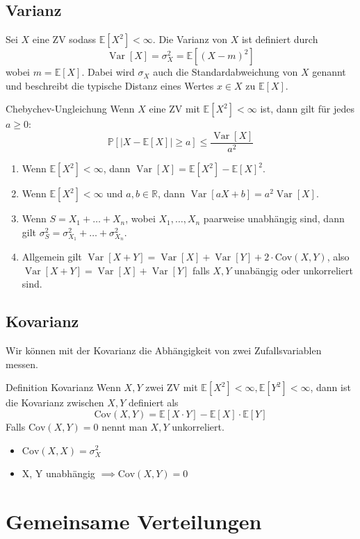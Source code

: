 \documentclass[a4paper,10pt]{article}
\def\R{\mathbb{R}}
\def\P{\mathbb{P}}
\def\E{\mathbb{E}}
\DeclareMathOperator{\Var}{\text{Var}}
\begin{document}
\subsection{Varianz}
Sei \(X\) eine ZV sodass \(\E[X^2] < \infty\). Die Varianz von \(X\) ist definiert durch
\[\Var[X] = \sigma_X^2 = \E[(X-m)^2]\]
wobei \(m=\E[X]\). Dabei wird \(\sigma_X\) auch die Standardabweichung von \(X\) genannt und beschreibt die typische Distanz eines Wertes \(x\in X\) zu \(\E[X]\).

\begin{subbox}{Chebychev-Ungleichung}
	Wenn \(X\) eine ZV mit \(\E[X^2] < \infty\) ist, dann gilt für jedes \(a \ge 0\):
	\[\P[|X - \E[X]| \ge a] \le \frac{\Var[X]}{a^2}\]
\end{subbox}

\begin{enumerate}
	\item Wenn \(\E[X^2] < \infty\), dann \(\Var[X] = \E[X^2] - \E[X]^2\).
	\item Wenn \(\E[X^2] < \infty\) und \(a, b \in \R\), dann \(\Var[a X + b] = a^2 \Var[X]\).
	\item Wenn \(S = X_1 + \ldots + X_n\), wobei \(X_1, \ldots, X_n\) paarweise unabhängig sind, dann gilt \(\sigma_S^2 = \sigma_{X_1}^2 + \ldots + \sigma_{X_n}^2\).
	\item Allgemein gilt $\Var[X + Y] = \Var[X] + \Var[Y] + 2 \cdot \text{Cov}(X, Y)$, also $\Var[X + Y] = \Var[X] + \Var[Y]$ falls $X, Y$ unabängig oder unkorreliert sind.
\end{enumerate}

\subsection{Kovarianz}
Wir können mit der Kovarianz die Abhängigkeit von zwei Zufallsvariablen messen.
\begin{subbox}{Definition Kovarianz}
	Wenn \(X, Y\) zwei ZV mit \(\E[X^2] < \infty, \E[Y^2] < \infty\), dann ist die Kovarianz zwischen \(X, Y\) definiert als
	\[\text{Cov}(X,Y) = \E[X \cdot Y] - \E[X] \cdot \E[Y]\]
	Falls $\text{Cov}(X,Y) = 0$ nennt man $X, Y$ unkorreliert.
\end{subbox}
\begin{itemize}
	\item \(\text{Cov}(X,X) = \sigma_X^2\)
	\item X, Y unabhängig \(\implies \text{Cov}(X,Y) = 0\)
\end{itemize}

\section{Gemeinsame Verteilungen}
\end{document}

